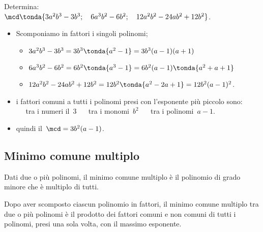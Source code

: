 \begin{esempio}{}{}
Determina:\\
\(\mcd \tonda{3a^{2}b^{3}-3b^{3};\quad 6a^{3}b^{2}-6b^{2}; 
            \quad 12a^{2}b^{2}-24ab^{2}+12b^{2}} \).
\begin{itemize}[nosep]
\item Scomponiamo in fattori i singoli polinomi;
\begin{itemize}[nosep]
\item \(3a^{2}b^{3}-3b^{3}=3b^{3} \tonda{a^{2}-1} =3b^{3}(a-1)(a+1)\)
\item \(6a^{3}b^{2}-6b^{2}=6b^{2} \tonda{a^{3}-1} =
        6b^{2}(a-1) \tonda{a^{2}+a+1} \)
\item \(12a^{2}b^{2}-24ab^{2}+12b^{2}=12b^{2} \tonda{a^{2}-2a+1} =
        12b^{2}(a-1)^{2}\).
\end{itemize}
\item i fattori comuni a tutti i polinomi presi con l'esponente più piccolo 
sono: \\
\textcolor{Salmon}{} ~~ tra i numeri il~\(3\) \hfill
\textcolor{Salmon}{} ~~ tra i monomi~\(b^{2}\) \hfill
\textcolor{Salmon}{} ~~ tra i polinomi~\(a-1\).
\item quindi il~\(\mcd=3b^{2}(a-1)\).
\end{itemize}
\end{esempio}

\subsection{Minimo comune multiplo}

\begin{definizione}{}{}
Dati due o più polinomi, il minimo comune multiplo è il polinomio 
di grado minore che è multiplo di tutti.
\end{definizione}

\begin{teorema}{}{}
Dopo aver scomposto ciascun polinomio in fattori, il minimo comune multiplo 
tra due o più polinomi è il prodotto dei fattori comuni e non comuni di tutti 
i polinomi, presi una sola volta, con il massimo esponente.
\end{teorema}

